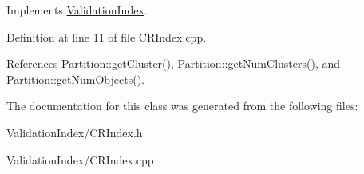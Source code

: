 Implements \hyperlink{classValidationIndex_a8b688d8d53fbdacec393730fe2bab614}{ValidationIndex}.

Definition at line 11 of file CRIndex.cpp.

References Partition::getCluster(), Partition::getNumClusters(), and Partition::getNumObjects().

The documentation for this class was generated from the following files:\begin{DoxyCompactItemize}
\item 
ValidationIndex/CRIndex.h\item 
ValidationIndex/CRIndex.cpp\end{DoxyCompactItemize}
